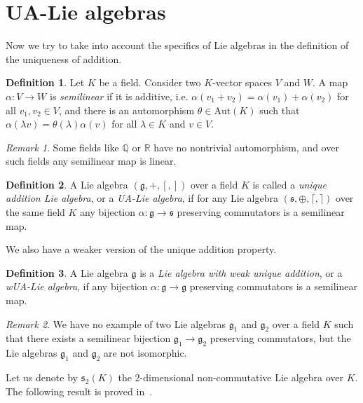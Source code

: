 \documentclass[a4paper,draft,reqno,12pt]{amsart}
\theoremstyle{definition}
\newtheorem{definition}{Definition}
\theoremstyle{remark}
\newtheorem {remark}{Remark}
\def\ggg{\mathfrak{g}}
\def\sss{\mathfrak{s}}
\begin{document}
\section{UA-Lie algebras}
\label{uala}

Now we try to take into account the specifics of Lie algebras in the definition of the uniqueness of addition.

\begin{definition}
Let $K$ be a field. Consider two $K$-vector spaces $V$ and $W$. A map $\alpha\colon V\to W$ is {\it semilinear} if it is additive, i.e. $\alpha(v_1+v_2)=\alpha(v_1)+\alpha(v_2)$ for all $v_1,v_2\in V$, and there is an automorphism $\theta\in\text{Aut}(K)$ such that $\alpha(\lambda v)=\theta(\lambda)\alpha(v)$ for all $\lambda\in K$ and $v\in V$. 
\end{definition}

\begin{remark}
Some fields like $\mathbb{Q}$ or $\mathbb{R}$ have no nontrivial automorphism, and over such fields any semilinear map is linear. 
\end{remark}


\begin{definition}
A Lie algebra $(\ggg,+,[,])$ over a field $K$ is called a {\it unique addition Lie algebra}, or a {\it UA-Lie algebra}, if for any Lie algebra $(\sss,\oplus,\lceil,\rceil)$ over the same field $K$ any bijection $\alpha\colon\ggg\to\sss$ preserving commutators is a semilinear map. 
\end{definition} 

We also have a weaker version of the unique addition property. 

\begin{definition}
\label{dbdb}
A Lie algebra $\ggg$ is a {\it Lie algebra with weak unique addition}, or a {\it wUA-Lie algebra}, if any bijection $\alpha\colon\ggg\to\ggg$ preserving commutators is a semilinear map.  
\end{definition} 

\begin{remark}
We have no example of two Lie algebras $\ggg_1$ and $\ggg_2$ over a field $K$ such that there exists a semilinear bijection $\ggg_1\to\ggg_2$ preserving
commutators, but the Lie algebras $\ggg_1$ and $\ggg_2$ are not isomorphic. 
\end{remark}

Let us denote by $\sss_2(K)$ the 2-dimensional non-commutative Lie algebra over $K$. The following result is proved in~\cite{A1,A2}.
\end{document}
